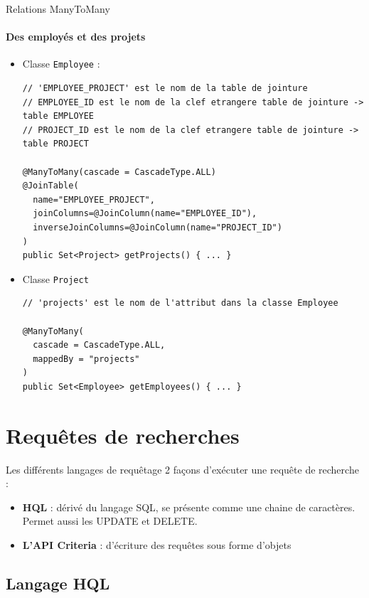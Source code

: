 \documentclass[compact]{beamer}%
\begin{document}
\begin{frame}[fragile]{Relations ManyToMany}
	\framesubtitle{Des employés et des projets}
	\begin{itemize}[<+->]
		\item Classe \texttt{Employee} : 
		\begin{lstlisting}
// 'EMPLOYEE_PROJECT' est le nom de la table de jointure
// EMPLOYEE_ID est le nom de la clef etrangere table de jointure -> table EMPLOYEE
// PROJECT_ID est le nom de la clef etrangere table de jointure -> table PROJECT

@ManyToMany(cascade = CascadeType.ALL)
@JoinTable(
  name="EMPLOYEE_PROJECT",
  joinColumns=@JoinColumn(name="EMPLOYEE_ID"),
  inverseJoinColumns=@JoinColumn(name="PROJECT_ID")
)
public Set<Project> getProjects() { ... }
		\end{lstlisting}
	
		\item Classe \texttt{Project}
		\begin{lstlisting}
// 'projects' est le nom de l'attribut dans la classe Employee

@ManyToMany(
  cascade = CascadeType.ALL,
  mappedBy = "projects"
)
public Set<Employee> getEmployees() { ... }
		\end{lstlisting}	
	\end{itemize}

\end{frame}



	
\section{Requêtes de recherches}

\begin{frame}{Les différents langages de requêtage}
	2 façons d'exécuter une requête de recherche :
	\begin{itemize}[<+->]
		\item \textbf{HQL} : dérivé du langage SQL, se présente comme une chaine de caractères. Permet aussi les UPDATE et DELETE.
		\item \textbf{L'API Criteria} : d'écriture des requêtes sous forme d'objets
	\end{itemize}

\end{frame}


\subsection{Langage HQL}
\end{document}
